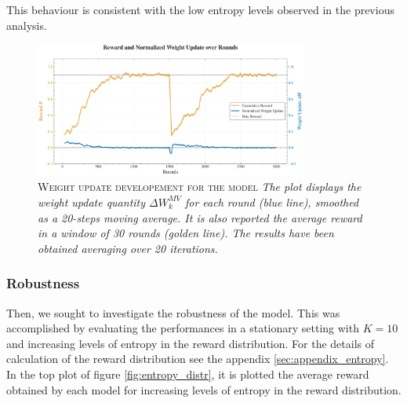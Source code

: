 This behaviour is consistent with the low entropy levels observed in the previous analysis.


\begin{figure}[H]
    \centering
    \includegraphics[width=0.8\textwidth]{figures/reward_update_plot.pdf}
    \caption{\textsc{Weight update developement for the model} \textit{The plot displays the weight update quantity $\Delta W_{k}^{MV}$ for each round (blue line), smoothed as a 20-steps moving average.
    It is also reported the average reward in a window of 30 rounds (golden line). The results have been obtained averaging over 20 iterations.}}
    \label{fig:rew_update}
\end{figure}


\subsubsection{Robustness}

\noindent Then, we sought to investigate the robustness of the model.
This was accomplished by evaluating the performances in a stationary setting with $K=10$ and increasing levels of entropy in the reward distribution. For the details of calculation of the reward distribution see the appendix \ref{sec:appendix_entropy}.
In the top plot of figure \ref{fig:entropy_distr}, it is plotted the average reward obtained by each model for increasing levels of entropy in the reward distribution.


